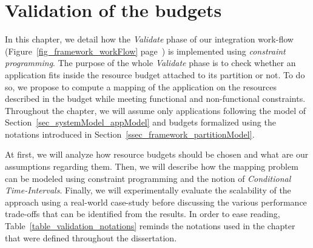 \documentclass[main.tex]{subfiles}
\begin{document}
\chapter{Validation of the budgets}
\thispagestyle{chapstyle}
\label{chap_budgetValidation}
\minitoc

In this chapter, we detail how the \emph{Validate} phase of our integration work-flow (Figure~\ref{fig_framework_workFlow} page~\pageref{fig_framework_workFlow}) is implemented using \emph{constraint programming}. The purpose of the whole \emph{Validate} phase is to check whether an application fits inside the resource budget attached to its partition or not. To do so, we propose to compute a mapping of the application on the resources described in the budget while meeting functional and non-functional constraints. Throughout the chapter, we will assume only applications following the model of Section~\ref{sec_systemModel_appModel} and budgets formalized using the notations introduced in Section~\ref{ssec_framework_partitionModel}.

At first, we will analyze how resource budgets should be chosen and what are our assumptions regarding them. Then, we will describe how the mapping problem can be modeled using constraint programming and the notion of \emph{Conditional Time-Intervals}. Finally, we will experimentally evaluate the scalability of the approach using a real-world case-study before discussing the various performance trade-offs that can be identified from the results. In order to ease reading, Table~\ref{table_validation_notations} reminds the notations used in the chapter that were defined throughout the dissertation.
\end{document}
